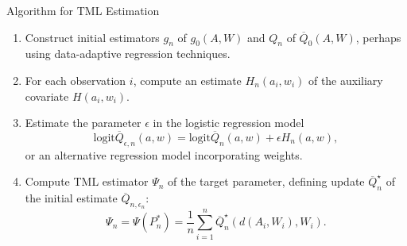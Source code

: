\documentclass{beamer}
\begin{document}

\begin{frame}[c]{Algorithm for TML Estimation}

\begin{center}
\begin{enumerate}\label{tmle_algo}
  \itemsep6pt
  \item Construct initial estimators $g_n$ of $g_0(A, W)$ and $Q_n$ of
    $\overline{Q}_0(A, W)$, perhaps using data-adaptive regression techniques.
  \item For each observation $i$, compute an estimate $H_n(a_i, w_i)$ of the
    auxiliary covariate $H(a_i,w_i)$.
  \item Estimate the parameter $\epsilon$ in the logistic regression model
    $$ \text{logit}\overline{Q}_{\epsilon, n}(a, w) =
    \text{logit}\overline{Q}_n(a, w) + \epsilon H_n(a, w),$$
    or an alternative regression model incorporating weights.
  \item Compute TML estimator $\Psi_n$ of the target parameter, defining update
    $\overline{Q}_n^{\star}$ of the initial estimate
    $\overline{Q}_{n, \epsilon_n}$:
    \begin{equation*}\label{tmle}
      \Psi_n = \Psi(P_n^*) = \frac{1}{n} \sum_{i = 1}^n
        \overline{Q}_n^{\star}(d(A_i, W_i), W_i).
      \end{equation*}
\end{enumerate}
\end{center}


\end{frame}

\end{document}
